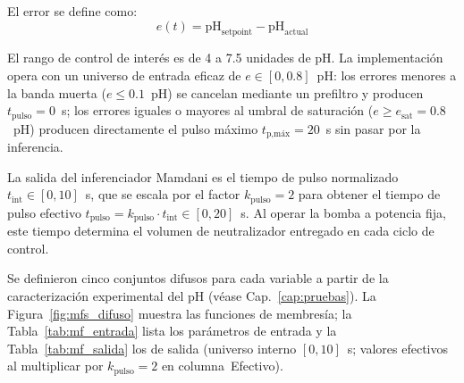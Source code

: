 El error se define como:
\begin{equation}
  e(t) = \text{pH}_{\text{setpoint}} - \text{pH}_{\text{actual}}
\end{equation}

El rango de control de interés es de 4 a 7.5 unidades de pH. La implementación
opera con un universo de entrada eficaz de $e \in [0, 0.8]$~pH: los errores
menores a la banda muerta ($e \leq 0.1$~pH) se cancelan mediante un prefiltro
y producen $t_\text{pulso} = 0$~s; los errores iguales o mayores al umbral de
saturación ($e \geq e_\text{sat} = 0.8$~pH) producen directamente el pulso máximo
$t_\text{p,máx} = 20$~s sin pasar por la inferencia.

La salida del inferenciador Mamdani es el tiempo de pulso normalizado
$t_\text{int} \in [0, 10]$~s, que se escala por el factor $k_\text{pulso} = 2$ para
obtener el tiempo de pulso efectivo $t_\text{pulso} = k_\text{pulso} \cdot t_\text{int}
\in [0, 20]$~s. Al operar la bomba a potencia fija, este tiempo determina el volumen
de neutralizador entregado en cada ciclo de control.

Se definieron cinco conjuntos difusos para cada variable a partir de la
caracterización experimental del pH (véase Cap.~\ref{cap:pruebas}). La
Figura~\ref{fig:mfs_difuso} muestra las funciones de membresía; la
Tabla~\ref{tab:mf_entrada} lista los parámetros de entrada y la
Tabla~\ref{tab:mf_salida} los de salida (universo interno $[0,10]$~s;
valores efectivos al multiplicar por $k_\text{pulso}=2$ en columna~Efectivo).

\begin{table}[H]
\centering
\caption{Funciones de membresía de la variable de entrada --- Error de pH.}
\label{tab:mf_entrada}
\renewcommand{\arraystretch}{1.3}
\small
{}
\end{table}

